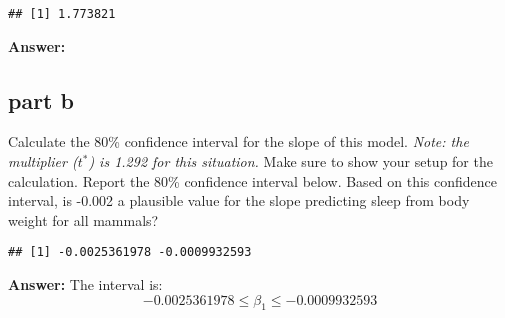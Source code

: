 \documentclass[
]{article}
\newenvironment{Shaded}{\begin{snugshade}}{\end{snugshade}}
\newcommand{\DecValTok}[1]{\textcolor[rgb]{0.00,0.00,0.81}{#1}}
\newcommand{\FloatTok}[1]{\textcolor[rgb]{0.00,0.00,0.81}{#1}}
\newcommand{\FunctionTok}[1]{\textcolor[rgb]{0.13,0.29,0.53}{\textbf{#1}}}
\newcommand{\NormalTok}[1]{#1}
\newcommand{\OtherTok}[1]{\textcolor[rgb]{0.56,0.35,0.01}{#1}}
\newcommand{\SpecialCharTok}[1]{\textcolor[rgb]{0.81,0.36,0.00}{\textbf{#1}}}
\newcommand{\StringTok}[1]{\textcolor[rgb]{0.31,0.60,0.02}{#1}}
\begin{document}
\begin{verbatim}
## [1] 1.773821
\end{verbatim}

\textbf{Answer:}

\subsection{part b}\label{part-b-2}

Calculate the 80\% confidence interval for the slope of this model.
\emph{Note: the multiplier (\(t^{*}\)) is 1.292 for this situation.}
Make sure to show your setup for the calculation. Report the 80\%
confidence interval below. Based on this confidence interval, is -0.002
a plausible value for the slope predicting sleep from body weight for
all mammals?

\begin{Shaded}
\end{Shaded}

\begin{verbatim}
## [1] -0.0025361978 -0.0009932593
\end{verbatim}

\textbf{Answer:} The interval is:
\[ -0.0025361978 \leq \beta_1 \leq -0.0009932593 \]
\end{document}
